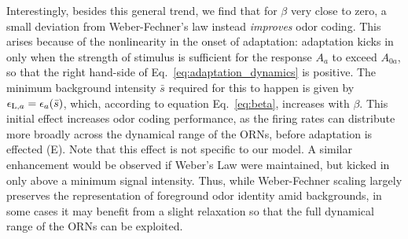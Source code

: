 \documentclass[9pt,lineno]{elife}
\begin{document}
Interestingly, besides this general trend, we find that for $\beta$ very close to zero, a small deviation from Weber-Fechner's law instead \textit{improves} odor coding. This arises because of the nonlinearity in the onset of adaptation: adaptation kicks in only when the strength of stimulus is sufficient for the response $A_a$ to exceed $A_{0a}$, so that the right hand-side of Eq.~\ref{eq:adaptation_dynamics} is positive. The minimum background intensity $\bar{s}$ required for this to happen is given by $\epsilon_{\textup{L}, a}=\epsilon_a(\bar{s})$, which, according to equation Eq.~\ref{eq:beta}, increases with $\beta$. This initial effect increases odor coding performance, as the firing rates can distribute more broadly across the dynamical range of the ORNs, before adaptation is effected (E). Note that this effect is not specific to our model. A similar enhancement would be observed if Weber's Law were maintained, but kicked in only above a minimum signal intensity. Thus, while Weber-Fechner scaling largely preserves the representation of foreground odor identity amid backgrounds, in some cases it may benefit from a slight relaxation so that the full dynamical range of the ORNs can be exploited.






\end{document}
